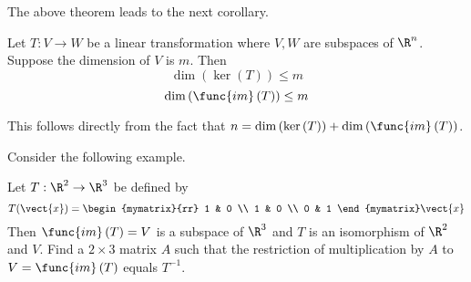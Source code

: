 The above theorem leads to the next corollary.

\begin{corollary}{}{}
Let $T:V\rightarrow W$ be a linear transformation where $V,W$ are subspaces of $\R^n$. Suppose the dimension of $V$ is $m$. Then 
\[
\dim \left( \ker \left( T\right) \right) \leq m
\]
\[
\dim \left( \func{im}\left( T \right) \right) \leq m
\]
\end{corollary}

This follows directly from the fact that $n=\dim \left( \ker \left( T\right) \right) +\dim \left( \func{im}\left(
T\right) \right) $.

Consider the following example.

\begin{example}{}{}
Let $T:\R^{2}\rightarrow \R^{3}$ be defined by 
\begin{equation*}
T(\vect{x})=\begin{mymatrix}{rr}
1 & 0 \\ 
1 & 0 \\ 
0 & 1
\end{mymatrix} \vect{x}
\end{equation*}
Then $\func{im}\left( T\right) =V$ is a subspace of $\R^{3}$ and $T$
is an isomorphism of $\R^{2}$ and $V$. Find a $2\times 3$ matrix $A$
such that the restriction of multiplication by $A$ to $V=\func{im}\left(
T\right) $ equals $T^{-1}$. 
\end{example}

